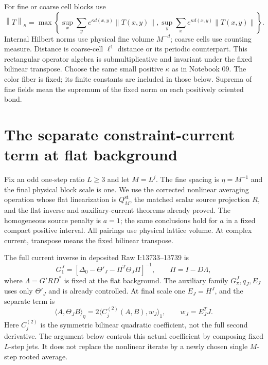 \documentclass[11pt]{article}
\theoremstyle{remark}
\newcommand{\norm}[1]{\left\|#1\right\|}
\begin{document}
For fine or coarse cell blocks use
\[
 \norm{T}_\kappa=\max\left\{
  \sup_x\sum_y e^{\kappa d(x,y)}\norm{T(x,y)},
  \sup_y\sum_x e^{\kappa d(x,y)}\norm{T(x,y)}\right\}.
\]
Internal Hilbert norms use physical fine volume $M^{-d}$; coarse
cells use counting measure. Distance is coarse-cell $\ell^1$ distance
or its periodic counterpart. This rectangular operator algebra is
submultiplicative and invariant under the fixed bilinear transpose.
Choose the same small positive $\kappa$ as in Notebook 09.
The color fiber is fixed; its finite constants are included in those
below. Suprema of fine fields mean the supremum of the fixed norm
on each positively oriented bond.

\section{The separate constraint-current term at flat background}
\label{fc-section}

Fix an odd one-step ratio $L\ge3$ and let $M=L^j$.
The fine spacing is $\eta=M^{-1}$ and the final physical block
scale is one. We use the corrected nonlinear averaging operation
whose flat linearization is $Q_M^{\mathrm{st}}$, the matched scalar
source projection $R$, and the flat inverse and auxiliary-current
theorems already proved. The homogeneous source penalty is $a=1$;
the same conclusions hold for $a$ in a fixed compact positive
interval. All pairings use physical lattice volume. At complex
current, transpose means the fixed bilinear transpose.

The full current inverse in deposited Raw I:13733--13739 is
\begin{equation}
 G_1^J=[\Delta_0-\Theta'_J-\Pi^T\Theta_J\Pi]^{-1},
 \qquad \Pi=I-D\Lambda,
 \label{fc-full-inverse-definition}
\end{equation}
where $\Lambda=G'RD^*$ is fixed at the flat background. The auxiliary
family $G_\pi^J,q_J,E_J$ uses only $\Theta'_J$ and is already
controlled. At final scale one $E_J=H^J$, and the separate term is
\begin{equation}
 \langle A,\Theta_J B\rangle_\eta
   =2\langle C_j^{(2)}(A,B),w_J\rangle_1,
 \qquad w_J=E_J^T J.
 \label{fc-constraint-form}
\end{equation}
Here $C_j^{(2)}$ is the symmetric bilinear quadratic coefficient,
not the full second derivative. The argument below controls this
actual coefficient by composing fixed $L$-step jets. It does not
replace the nonlinear iterate by a newly chosen single $M$-step
rooted average.
\end{document}
